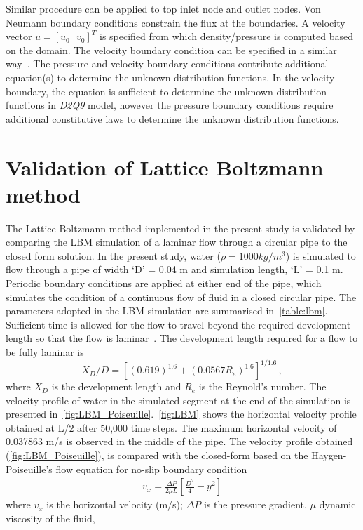 Similar procedure can be applied to top inlet node and outlet 
nodes. Von Neumann boundary conditions constrain the flux at 
the boundaries. A velocity vector $u=\left[ u_0\mbox{ }v_0 
\right]^T$ is specified from which density/pressure is computed 
based on the domain. The velocity boundary condition can be 
specified in a similar way~\citep{Zou1997}. The pressure and 
velocity boundary conditions contribute additional equation(s) 
to determine the unknown distribution functions. In the 
velocity boundary, the equation is sufficient to determine the 
unknown distribution functions in \textit{D2Q9} model, however 
the pressure boundary conditions require additional 
constitutive laws to determine the unknown distribution 
functions. 


\section{Validation of Lattice Boltzmann method}

The Lattice Boltzmann method implemented in the present study is validated by 
comparing the LBM simulation of a laminar flow through a circular pipe to 
the closed form solution. In the present study, water ($\rho=1000 kg/m^{3}$) is 
simulated to flow through a pipe of width `D' = 0.04 m and 
simulation length, `L' = 0.1 m. Periodic boundary conditions are applied at 
either end of the pipe, which simulates the condition of a continuous flow of 
fluid in a closed circular pipe. The parameters adopted in the LBM simulation 
are summarised in~\cref{table:lbm}. Sufficient time is allowed for the flow to 
travel beyond the required development length so that the flow is 
laminar~\citet{Durst2005}. The development length required for a flow to 
be fully laminar is
%
\begin{equation}
X_{D}/D=[(0.619)^{1.6}+(0.0567 R_{e})^{1.6}]^{1/1.6} \,,
\end{equation}
%
\noindent where $X_{D}$ is the development length and $R_{e}$ is the Reynold's 
number. The velocity profile of water in the simulated segment at the end of 
the simulation is presented in~\cref{fig:LBM_Poiseuille}.~\cref{fig:LBM} shows 
the horizontal velocity profile obtained at L/2 after 50,000 time steps. The 
maximum horizontal velocity of 0.037863 m/s is observed in the middle of the 
pipe. The velocity profile obtained (\cref{fig:LBM_Poiseuille}), is compared 
with the closed-form based on the Haygen-Poiseuille's flow equation for no-slip 
boundary condition~\citep{Willis2008}
%
\begin{align}
\mathit{v}_{\mathit{x}}=\frac{\Delta P}{2 \mu L} [\frac{D^{2}}{4}-y^{2}]
\end{align}
%
where $v_{x}$ is the horizontal velocity (m/s); $\Delta P$ is the pressure 
gradient, $\mu$ dynamic viscosity of the fluid, 

